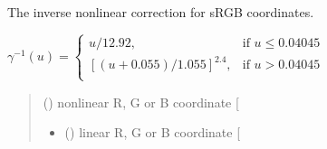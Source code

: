 \documentclass[letterpaper,10pt,english]{sphinxmanual}
\begin{document}
\begin{fulllineitems}
\label{\detokenize{07_colors:skinoptics.colors.inv_nonlinear_corr_sRGB}}
\pysigstartsignatures
{}
\pysigstopsignatures
\sphinxAtStartPar
The inverse nonlinear correction for sRGB coordinates.

\sphinxAtStartPar
\(\gamma^{-1}(u) =  
\left \{ \begin{matrix}
u/12.92, & \mbox{if } u \le 0.04045 \\
[(u + 0.055)/1.055]^{2.4}, & \mbox{if } u > 0.04045 \\
\end{matrix} \right.\)
\begin{quote}\begin{description}
\sphinxAtStartPar
{} () \textendash{} nonlinear R, G or B coordinate {[}\sphinxhyphen{}{]}

\sphinxAtStartPar
\begin{itemize}
\item {} 
\sphinxAtStartPar
{} () \textendash{} linear R, G or B coordinate {[}\sphinxhyphen{}{]}

\end{itemize}


\end{description}\end{quote}

\end{fulllineitems}

\end{document}
